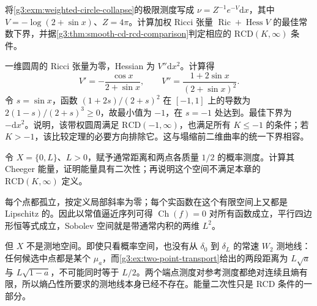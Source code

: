 \begin{exercise}\label{g3:ex:weighted-circle-ricci}
	将\cref{g3:exm:weighted-circle-collapse}的极限测度写成 \(\nu=Z^{-1}e^{-V}\mathrm dx\)，其中 \(V=-\log(2+\sin x)\)、\(Z=4\pi\)。计算加权 Ricci 张量 \(\operatorname{Ric}+\operatorname{Hess}V\) 的最佳常数下界，并据\cref{g3:thm:smooth-cd-rcd-comparison}判定相应的 \(\mathrm{RCD}(K,\infty)\) 条件。
\end{exercise}
\begin{solution}
	一维圆周的 Ricci 张量为零，Hessian 为 \(V''\mathrm dx^2\)。计算得
	\[
		V'=-\frac{\cos x}{2+\sin x},\qquad
		V''=\frac{1+2\sin x}{(2+\sin x)^2}.
	\]
	令 \(s=\sin x\)，函数 \((1+2s)/(2+s)^2\) 在 \([-1,1]\) 上的导数为 \(2(1-s)/(2+s)^3\ge0\)，故最小值为 \(-1\)，在 \(s=-1\) 处达到。最佳下界为 \(-\mathrm dx^2\)。说明，该带权圆周满足 \(\mathrm{RCD}(-1,\infty)\)，也满足所有 \(K\le-1\) 的条件；若 \(K>-1\)，该比较定理的必要方向排除它。这与塌缩前二维曲率的统一下界相容。
\end{solution}

\begin{exercise}\label{g3:ex:quadratic-energy-not-rcd}
	令 \(X=\{0,L\}\)、\(L>0\)，赋予通常距离和两点各质量 \(1/2\) 的概率测度。计算其 Cheeger 能量，证明能量具有二次性；再说明这个空间不满足本章的 \(\mathrm{RCD}(K,\infty)\) 定义。
\end{exercise}
\begin{solution}
	每个点都孤立，按定义局部斜率为零；每个实函数在这个有限空间上又都是 Lipschitz 的。因此以常值逼近序列可得 \(\operatorname{Ch}(f)=0\) 对所有函数成立，平行四边形恒等式成立，Sobolev 空间就是带通常内积的两维 \(L^2\)。

	但 \(X\) 不是测地空间。即使只看概率空间，也没有从 \(\delta_0\) 到 \(\delta_L\) 的常速 \(W_2\) 测地线：任何候选中点都是某个 \(\mu_a\)，而\cref{g3:ex:two-point-transport}给出的两段距离为 \(L\sqrt a\) 与 \(L\sqrt{1-a}\)，不可能同时等于 \(L/2\)。两个端点测度对参考测度都绝对连续且熵有限，所以熵凸性所要求的测地线本身已经不存在。能量二次性只是 RCD 条件的一部分。
\end{solution}

